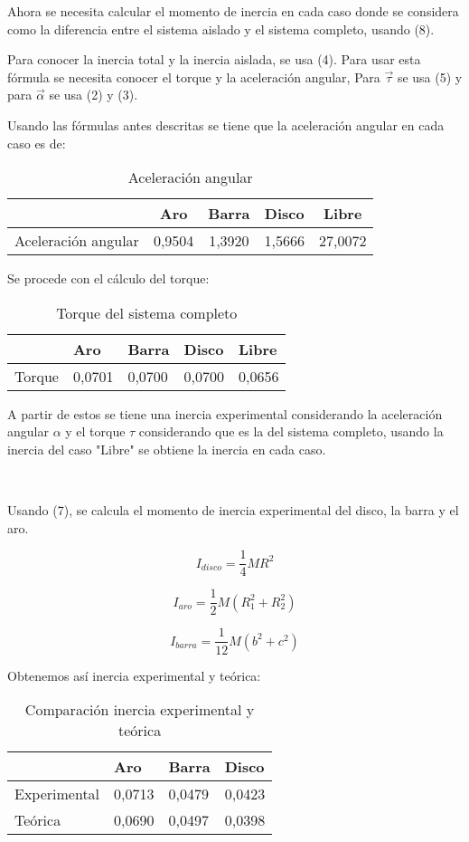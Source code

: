 \documentclass[a4paper]{article}
\begin{document}
Ahora se necesita calcular el momento de inercia en cada caso donde se considera como la diferencia entre el sistema aislado y el sistema completo, usando (8).

Para conocer la inercia total y la inercia aislada, se usa (4). Para usar esta fórmula se necesita conocer el torque y la aceleración angular, Para $\Vec{\tau}$ se usa (5) y para $\Vec{\alpha}$ se usa (2) y (3).

Usando las fórmulas antes descritas se tiene que la aceleración angular en cada caso es de: 

\begin{table}[H]
    \centering
    \begin{tabular}{|c|c|c|c|c|}
    \hline
        ~ & Aro & Barra & Disco & Libre \\ \hline
        Aceleración angular & 0,9504 & 1,3920 & 1,5666 & 27,0072  \\ \hline
    \end{tabular}
    \caption{Aceleración angular}
\end{table}

Se procede con el cálculo del torque:

\begin{table}[H]
    \centering
    \begin{tabular}{|l|l|l|l|l|}
    \hline
        ~ & Aro & Barra & Disco & Libre \\ \hline
        Torque & 0,0701 & 0,0700 & 0,0700 & 0,0656 \\ \hline
    \end{tabular}
    \caption{Torque del sistema completo}
\end{table}

A partir de estos se tiene una inercia experimental considerando la aceleración angular $\alpha$ y el torque $\tau$ considerando que es la del sistema completo, usando la inercia del caso "Libre" se obtiene la inercia en cada caso.

\

Usando (7), se calcula el momento de inercia experimental del disco, la barra y el aro.

\[I_{disco}=\frac{1}{4}MR^2\]

\[I_{aro}=\frac{1}{2}M(R_1^2+R_2^2)\]

\[I_{barra}=\frac{1}{12}M(b^2+c^2)\]

Obtenemos así inercia experimental y teórica:

\begin{table}[H]
    \centering
    \begin{tabular}{|l|l|l|l|}
    \hline
        ~ & Aro & Barra & Disco  \\ \hline
        Experimental & 0,0713 & 0,0479 & 0,0423  \\ \hline
        Teórica & 0,0690 & 0,0497 & 0,0398  \\ \hline
    \end{tabular}
    \caption{Comparación inercia experimental y teórica}
\end{table}
\end{document}
